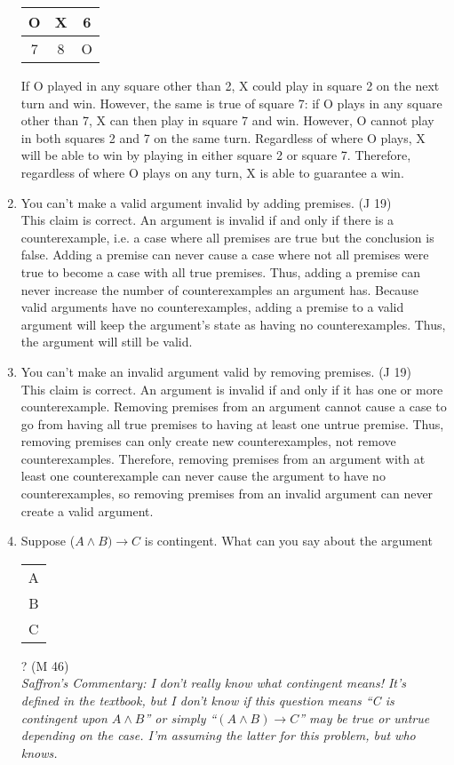 \documentclass{article}
\begin{document}
\begin{enumerate}
\begin{center}
\begin{tabular}{c|c|c}
                        \hline
                        O & X & 6 \\
                        \hline
                        7 & 8 & O
                  \end{tabular}
            \end{center}
            If O played in any square other than 2, X could play in square 2 on the next turn and win. However, the same is true of square 7: if O plays in any square other than 7, X can then play in square 7 and win.
            However, O cannot play in both squares 2 and 7 on the same turn. Regardless of where O plays, X will be able to win by playing in either square 2 or square 7. Therefore, regardless of where O plays on any turn, X is able to guarantee a win. 
      \item You can't make a valid argument invalid by adding premises. (J 19)\\
            This claim is correct. An argument is invalid if and only if there is a counterexample, i.e. a case where all premises are true but the conclusion is false. Adding a premise can never cause a case where not all premises were true to become a case with all true premises. Thus, adding a premise can never increase the number of counterexamples an argument has. Because valid arguments have no counterexamples, adding a premise to a valid argument will keep the argument's state as having no counterexamples. Thus, the argument will still be valid.
      \item You can't make an invalid argument valid by removing premises. (J 19)\\
            This claim is correct. An argument is invalid if and only if it has one or more counterexample. Removing premises from an argument cannot cause a case to go from having all true premises to having at least one untrue premise. Thus, removing premises can only create new counterexamples, not remove counterexamples. Therefore, removing premises from an argument with at least one counterexample can never cause the argument to have no counterexamples, so removing premises from an invalid argument can never create a valid argument.
      \item Suppose ($A \land B) \to C$ is contingent. What can you say about the argument \begin{tabular}{c}A\\B\\\hline C\end{tabular}? (M 46)\\
            \textit{Saffron's Commentary: I don't really know what contingent means! It's defined in the textbook, but I don't know if this question means “C is contingent upon $A \land B$” or simply “$(A \land B) \to C$” may be true or untrue depending on the case. I'm assuming the latter for this problem, but who knows.
}
\end{enumerate}
\end{document}
